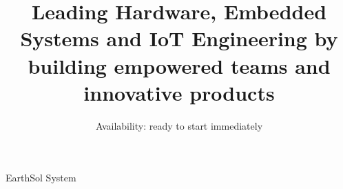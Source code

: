\title{Leading Hardware, Embedded Systems and IoT Engineering by building empowered teams and innovative products}
\subtitle{Availability: ready to start immediately}
\address{1 Starfleet Plaza}{Earth}{Sol System}
